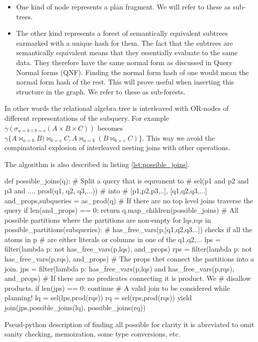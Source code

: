 \begin{itemize}
\item One kind of node represents a plan fragment. We will refer to
  these as sub-trees.
\item The other kind represents a forest of semantically equivalent
  subtrees earmarked with a unique hash for them. The fact that the
  subtrees are semantically equivalent means that they essentially
  evaluate to the same data. They therefore have the same normal form
  as discussed in Query Normal forms (QNF). Finding the normal form
  hash of one would mean the normal form hash of the rest. This will
  prove useful when inserting this structure in the graph. We refer to
  these as sub-forests.
\end{itemize}

In other words the relational algebra tree is interleaved with
OR-nodes of different representations of the subquery. For example
\(\gamma(\sigma_{a=b \land b=c}(A \times B \times C))\) becomes
\(\gamma\{A \Join_{a=b} B) \Join_{b=c} C, A \Join_{a=b} (B \Join_{b=c}
C)\}\). This way we avoid the compinatorial explosion of interleaved
nesting joins with other operations.

The algorithm is also described in listing \ref{lst:possible_joins}.

\begin{code}
  \begin{pycode}
    def possible_joins(q):
        # Split a query that is equvanent to
        # sel(p1 and p2 and p3 and ..., prod(q1, q2, q3,...))
        # into
        # [p1,p2,p3,..], [q1,q2,q3,...]
        and_props,subqueries =  as_prod(q)
        # If there are no top level joins traverse the query
        if len(and_props) == 0:
            return q.map_children(possible_joins)
        # All possible partitions where the partitions are non-empty
        for lqs,rqs in possible_partitions(subqueries):
            # has_free_vars(p,[q1,q2,q3...]) checks if all the atoms in p
            # are either literals or columns in one of the q1,q2,...
            lps = filter(lambda p: not has_free_vars(p,lqs), and_props)
            rps = filter(lambda p: not has_free_vars(p,rqs), and_props)
            # The props thet connect the partitions into a join.
            jps = filter(lambda p: has_free_vars(p,lqs)
                         and has_free_vars(p,rqs),
                         and_props)
            # If there are no predicates connecting it is product. We
            # disallow products.
            if len(jps) == 0: continue
            # A valid join to be considered while planning!
            lq = sel(lps,prod(rqs))
            rq = sel(rps,prod(rqs))
            yield join(jps,possible_joins(lq), possible_joins(rq))
  \end{pycode}
  \label{lst:possible_joins}
  \caption{Pseud-python description of finding all
    possible for clarity it is abreviated to omit sanity checking,
    memoization, some type conversions, etc.}
\end{code}

